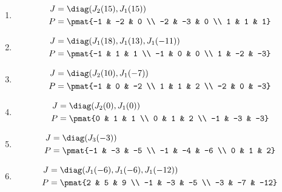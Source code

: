 \begin{enumerate}
\item

\begin{align*}
J &= \diag(J_{2}(15), J_{1}(15))\\
P &= \pmat{-1 & -2 & 0 \\ -2 & -3 & 0 \\ 1 & 1 & 1}
\end{align*}

\item

\begin{align*}
J &= \diag(J_{1}(18), J_{1}(13), J_{1}(-11))\\
P &= \pmat{-1 & 1 & 1 \\ -1 & 0 & 0 \\ 1 & -2 & -3}
\end{align*}

\item

\begin{align*}
J &= \diag(J_{2}(10), J_{1}(-7))\\
P &= \pmat{-1 & 0 & -2 \\ 1 & 1 & 2 \\ -2 & 0 & -3}
\end{align*}

\item

\begin{align*}
J &= \diag(J_{2}(0), J_{1}(0))\\
P &= \pmat{0 & 1 & 1 \\ 0 & 1 & 2 \\ -1 & -3 & -3}
\end{align*}

\item

\begin{align*}
J &= \diag(J_{3}(-3))\\
P &= \pmat{-1 & -3 & -5 \\ -1 & -4 & -6 \\ 0 & 1 & 2}
\end{align*}

\item

\begin{align*}
J &= \diag(J_{1}(-6), J_{1}(-6), J_{1}(-12))\\
P &= \pmat{2 & 5 & 9 \\ -1 & -3 & -5 \\ -3 & -7 & -12}
\end{align*}


\end{enumerate}
